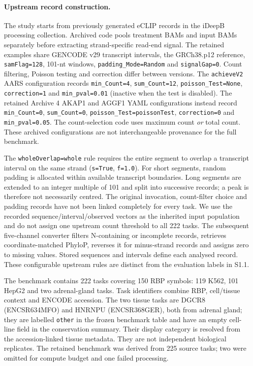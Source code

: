 \documentclass[11pt]{article}
\begin{document}
\paragraph{Upstream record construction.}
The study starts from previously generated eCLIP records in the iDeepB processing collection. Archived code pools treatment BAMs and input BAMs separately before extracting strand-specific read-end signal. The retained examples share GENCODE v29 transcript intervals, the GRCh38.p12 reference, \texttt{samFlag=128}, 101-nt windows, \texttt{padding\_Mode=Random} and \texttt{signalGap=0}. Count filtering, Poisson testing and correction differ between versions. The \texttt{achieveV2} AARS configuration records \texttt{min\_Count=4}, \texttt{sum\_Count=12}, \texttt{poisson\_Test=None}, \texttt{correction=1} and \texttt{min\_pval=0.01} (inactive when the test is disabled). The retained Archive 4 AKAP1 and AGGF1 YAML configurations instead record \texttt{min\_Count=0}, \texttt{sum\_Count=0}, \texttt{poisson\_Test=poissonTest}, \texttt{correction=0} and \texttt{min\_pval=0.05}. The count-selection code uses maximum count \emph{or} total count. These archived configurations are not interchangeable provenance for the full benchmark.

The \texttt{wholeOverlap=whole} rule requires the entire segment to overlap a transcript interval on the same strand (\texttt{s=True}, \texttt{f=1.0}). For short segments, random padding is allocated within available transcript boundaries. Long segments are extended to an integer multiple of 101 and split into successive records; a peak is therefore not necessarily centred. The original invocation, count-filter choice and padding records have not been linked completely for every task. We use the recorded sequence/interval/observed vectors as the inherited input population and do not assign one upstream count threshold to all 222 tasks. The subsequent five-channel converter filters N-containing or incomplete records, retrieves coordinate-matched PhyloP, reverses it for minus-strand records and assigns zero to missing values. Stored sequences and intervals define each analysed record. These configurable upstream rules are distinct from the evaluation labels in S1.1.

The benchmark contains 222 tasks covering 150 RBP symbols: 119 K562, 101 HepG2 and two adrenal-gland tasks. Task identifiers combine RBP, cell/tissue context and ENCODE accession. The two tissue tasks are DGCR8 (ENCSR634MFO) and HNRNPU (ENCSR368GER), both from adrenal gland; they are labelled \texttt{other} in the frozen benchmark table and have an empty cell-line field in the conservation summary. Their display category is resolved from the accession-linked tissue metadata. They are not independent biological replicates. The retained benchmark was derived from 225 source tasks; two were omitted for compute budget and one failed processing.
\end{document}
